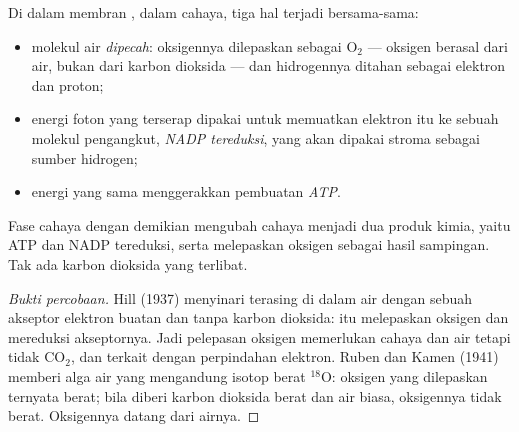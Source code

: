\begin{proposition}\label{prop:g12:photosynthesis:lightphase}
Di dalam membran , dalam cahaya, tiga hal terjadi
bersama-sama:
\begin{itemize}
  \item molekul air \emph{dipecah}: oksigennya dilepaskan sebagai
        $\mathrm{O_2}$ --- oksigen  berasal dari air,
        bukan dari karbon dioksida --- dan hidrogennya ditahan sebagai
        elektron dan proton;
  \item energi foton yang terserap dipakai untuk memuatkan elektron
        itu ke sebuah molekul pengangkut, \emph{NADP tereduksi}, yang
        akan dipakai stroma sebagai sumber hidrogen;
  \item energi yang sama menggerakkan pembuatan \emph{ATP}.
\end{itemize}
Fase cahaya dengan demikian mengubah cahaya menjadi dua produk kimia,
yaitu ATP dan NADP tereduksi, serta melepaskan oksigen sebagai hasil
sampingan. Tak ada karbon dioksida yang terlibat.
\end{proposition}
\begin{proof}[Bukti percobaan]
Hill (1937) menyinari  terasing di dalam air dengan sebuah
akseptor elektron buatan dan tanpa karbon dioksida:  itu
melepaskan oksigen dan mereduksi akseptornya. Jadi pelepasan oksigen
memerlukan cahaya dan air tetapi tidak $\mathrm{CO_2}$, dan terkait
dengan perpindahan elektron. Ruben dan Kamen (1941) memberi alga air
yang mengandung isotop berat $^{18}$O: oksigen yang dilepaskan ternyata
berat; bila diberi karbon dioksida berat dan air biasa, oksigennya
tidak berat. Oksigennya datang dari airnya.
\end{proof}

